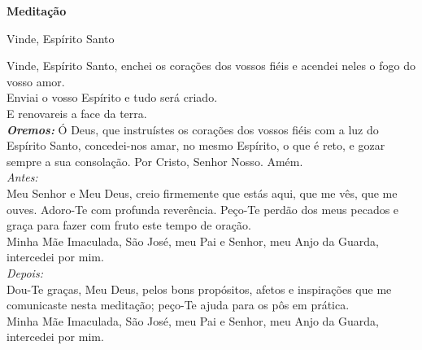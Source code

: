 \newpage
\begin{center}
    \textbf{Meditação}
\end{center}
\begin{center}
    Vinde, Espírito Santo
\end{center}
\begin{flushleft}
    Vinde, Espírito Santo, enchei os corações dos vossos fiéis e acendei neles o fogo do vosso amor. \\
    \VbarRed{} Enviai o vosso Espírito e tudo será criado. \\
    \RbarRed{} E renovareis a face da terra.
    \vspace{.2cm} \\
    \textbf{\textit{Oremos:}} Ó Deus, que instruístes os corações dos vossos fiéis com a luz do Espírito Santo, concedei-nos amar, no mesmo Espírito, o que é reto, e gozar sempre a sua consolação. Por Cristo, Senhor Nosso. Amém.
    \vspace{.2cm} \\
    \textit{Antes:} \\ Meu Senhor e Meu Deus, creio firmemente que estás aqui, que me vês, que me ouves. Adoro-Te com profunda reverência. Peço-Te perdão dos meus pecados e graça para fazer com fruto este tempo de oração. \\ Minha Mãe Imaculada, São José, meu Pai e Senhor, meu Anjo da Guarda, intercedei por mim.
    \vspace{.2cm} \\
    \textit{Depois:} \\ Dou-Te graças, Meu Deus, pelos bons propósitos, afetos e inspirações que me comunicaste nesta meditação; peço-Te ajuda para os pôs em prática. \\ Minha Mãe Imaculada, São José, meu Pai e Senhor, meu Anjo da Guarda, intercedei por mim.
\end{flushleft}
